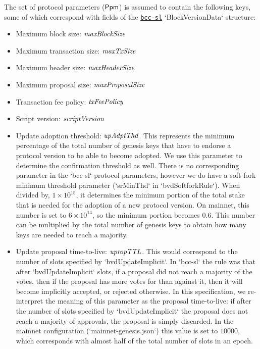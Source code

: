 The set of protocol parameters ($\mathsf{Ppm}$) is assumed to contain the following
keys, some of which correspond with fields of the
\href{https://github.com/The-Blockchain-Company/bcc-sl/}{\texttt{bcc-sl}}
`BlockVersionData` structure:
\begin{itemize}
\item Maximum block size: $\mathit{maxBlockSize}$
\item Maximum transaction size: $\mathit{maxTxSize}$
\item Maximum header size: $\mathit{maxHeaderSize}$
\item Maximum proposal size: $\mathit{maxProposalSize}$
\item Transaction fee policy: $\mathit{txFeePolicy}$
\item Script version: $\mathit{scriptVersion}$
\item Update adoption threshold: $\mathit{upAdptThd}$. This represents the minimum
  percentage of the total number of genesis keys that have to endorse a protocol
  version to be able to become adopted. We use this parameter to determine the
  confirmation threshold as well. There is no corresponding parameter in the
  `bcc-sl` protocol parameters, however we do have a soft-fork minimum
  threshold parameter (`srMinThd` in `bvdSoftforkRule`). When divided by,
  $1\times 10^{15}$, it determines the minimum portion of the total stake that
  is needed for the adoption of a new protocol version. On mainnet, this number
  is set to $6 \times 10^{14}$, so the minimum portion becomes $0.6$. This
  number can be multiplied by the total number of genesis keys to obtain how
  many keys are needed to reach a majority.
\item Update proposal time-to-live: $\mathit{upropTTL}$. This would correspond to
  the number of slots specified by `bvdUpdateImplicit`. In `bcc-sl` the
  rule was that after `bvdUpdateImplicit` slots, if a proposal did not reach a
  majority of the votes, then if the proposal has more votes for than against
  it, then it will become implicitly accepted, or rejected otherwise. In this
  specification, we re-interpret the meaning of this parameter as the proposal
  time-to-live: if after the number of slots specified by `bvdUpdateImplicit`
  the proposal does not reach a majority of approvals, the proposal is simply
  discarded. In the mainnet configuration (`mainnet-genesis.json`) this value is
  set to $10000$, which corresponds with almost half of the total number of
  slots in an epoch.
\end{itemize}

